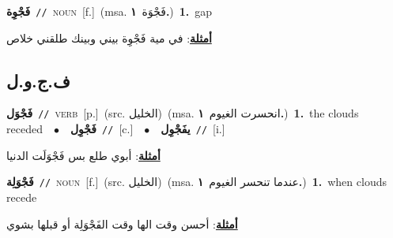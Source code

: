 \documentclass[10pt,a4paper,twoside]{article} %
\begin{document}
\begin{multicols}{2}
{\setlength\topsep{0pt}\textbf{\foreignlanguage{arabic}{فَجْوِة}}\ {\color{gray}\texttt{//}\color{black}}\ \textsc{noun}\ [f.]\ \color{gray}(msa. \foreignlanguage{arabic}{فَجْوَة}~\foreignlanguage{arabic}{\textbf{١.}})\color{black}\ \textbf{1.}~gap\  \begin{flushright}\color{gray}\foreignlanguage{arabic}{\textbf{\underline{\foreignlanguage{arabic}{أمثلة}}}: في مية فَجْوِة بيني وبينك طلقني خلاص}\end{flushright}\color{black}} \vspace{2mm}

\vspace{-3mm}
\subsection*{\color{blue}\foreignlanguage{arabic}{ف.ج.و.ل}\color{blue}{}} 

{\setlength\topsep{0pt}\textbf{\foreignlanguage{arabic}{فَجْوَل}}\ {\color{gray}\texttt{//}\color{black}}\ \textsc{verb}\ [p.]\ (src. \color{gray}\foreignlanguage{arabic}{الخليل}\color{black})\ \color{gray}(msa. \foreignlanguage{arabic}{انحسرت الغيوم}~\foreignlanguage{arabic}{\textbf{١.}})\color{black}\ \textbf{1.}~the clouds receded\ \ $\bullet$\ \ \setlength\topsep{0pt}\textbf{\foreignlanguage{arabic}{فَجْوِل}}\ {\color{gray}\texttt{//}\color{black}}\ [c.]\ \ $\bullet$\ \ \setlength\topsep{0pt}\textbf{\foreignlanguage{arabic}{يفَجْوِل}}\ {\color{gray}\texttt{//}\color{black}}\ [i.]\  \begin{flushright}\color{gray}\foreignlanguage{arabic}{\textbf{\underline{\foreignlanguage{arabic}{أمثلة}}}: أبوي طلع بس فَجْوَلَت الدنيا}\end{flushright}\color{black}} \vspace{2mm}

{\setlength\topsep{0pt}\textbf{\foreignlanguage{arabic}{فَجْوَلِة}}\ {\color{gray}\texttt{//}\color{black}}\ \textsc{noun}\ [f.]\ (src. \color{gray}\foreignlanguage{arabic}{الخليل}\color{black})\ \color{gray}(msa. \foreignlanguage{arabic}{عندما تنحسر الغيوم}~\foreignlanguage{arabic}{\textbf{١.}})\color{black}\ \textbf{1.}~when clouds recede\  \begin{flushright}\color{gray}\foreignlanguage{arabic}{\textbf{\underline{\foreignlanguage{arabic}{أمثلة}}}: أحسن وقت الها وقت الفَجْوَلِة أو قبلها بشوي}\end{flushright}\color{black}} \vspace{2mm}


\end{multicols}
\end{document}
